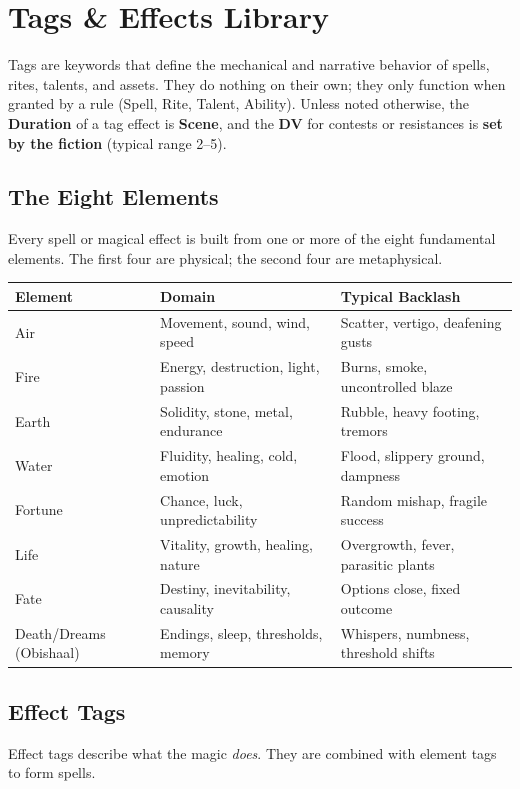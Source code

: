 \section{Tags \& Effects Library}
\label{sec:tags}

Tags are keywords that define the mechanical and narrative behavior of spells, rites, talents, and assets. 
They do nothing on their own; they only function when granted by a rule (Spell, Rite, Talent, Ability). 
Unless noted otherwise, the \textbf{Duration} of a tag effect is \textbf{Scene}, and the \textbf{DV} for contests or resistances is \textbf{set by the fiction} (typical range 2–5).

\subsection{The Eight Elements}
Every spell or magical effect is built from one or more of the eight fundamental elements. The first four are physical; the second four are metaphysical.

\begin{center}
\begin{tabular}{lll}
\toprule
\textbf{Element} & \textbf{Domain} & \textbf{Typical Backlash} \\
\midrule
Air   & Movement, sound, wind, speed & Scatter, vertigo, deafening gusts \\
Fire  & Energy, destruction, light, passion & Burns, smoke, uncontrolled blaze \\
Earth & Solidity, stone, metal, endurance & Rubble, heavy footing, tremors \\
Water & Fluidity, healing, cold, emotion & Flood, slippery ground, dampness \\
\addlinespace
Fortune  & Chance, luck, unpredictability & Random mishap, fragile success \\
Life     & Vitality, growth, healing, nature & Overgrowth, fever, parasitic plants \\
Fate     & Destiny, inevitability, causality & Options close, fixed outcome \\
Death/Dreams (Obishaal) & Endings, sleep, thresholds, memory & Whispers, numbness, threshold shifts \\
\bottomrule
\end{tabular}
\end{center}

\subsection{Effect Tags}
Effect tags describe what the magic \textit{does}. They are combined with element tags to form spells.

